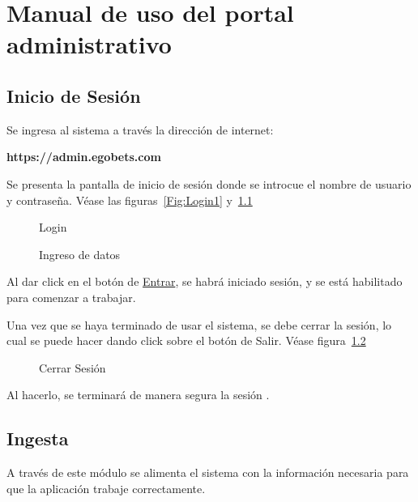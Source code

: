 \chapter{Manual de uso del portal administrativo}\label{chap:ruina}

\graphicspath{{/Users/brunomedina/Dropbox/Tesis-Egobets/egobets-notas/resources/admin/}}

\section{Inicio de Sesión}
Se ingresa al sistema a través la dirección de internet: 
\begin{tightcenter}
	\textbf{https://admin.egobets.com}
\end{tightcenter}Se presenta la pantalla de inicio de sesión donde se introcue el nombre de usuario y contraseña. Véase las figuras~\ref{Fig:Login1} y~\ref{Fig:Login2}
\pagebreak
\begin{figure}[!htb]\centering
   \begin{minipage}{0.49\textwidth}
     \caption{Login}\label{Fig:Login1}
   \end{minipage}
   \begin {minipage}{0.49\textwidth}
     \caption{Ingreso de datos}\label{Fig:Login2}
   \end{minipage}
\end{figure}

Al dar click en el botón de \underline{Entrar}, se habrá iniciado sesión, y se está habilitado para comenzar a trabajar.

Una vez que se haya terminado de usar el sistema, se debe cerrar la sesión, lo cual se puede hacer dando click sobre el botón de Salir. Véase figura~\ref{Fig:Logout}

\begin{figure}[!htb]\centering
   \begin {minipage}{0.49\textwidth}
     \caption[Cerrar Sesión]{Cerrar Sesión}\label{Fig:Logout}
   \end{minipage}
\end{figure}

Al hacerlo, se terminará de manera segura la sesión .
\section{Ingesta}
A través de este módulo se alimenta el sistema con la información necesaria para que la aplicación trabaje correctamente.

